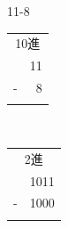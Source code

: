 \documentclass[handout]{beamer}        %
\begin{document}
\begin{frame}[fragile]
\begin{minipage}{0.48\columnwidth}
\begin{itembox}[l]{11-8}
{\begin{tabular}{r r}
            \multicolumn{2}{c}{10進} \\
              & 11 \\
            - &  8 \\
            \cline{1-2}
              &
          \end{tabular}~~~
          \begin{tabular}{r r}
            \multicolumn{2}{c}{2進} \\
              & 1011 \\
            - & 1000 \\
            \cline{1-2}
              &
          \end{tabular}
        }
      \end{itembox}
    \end{minipage}
    \begin{minipage}{0.48\columnwidth}
    \end{minipage}
\end{frame}
\end{document}
